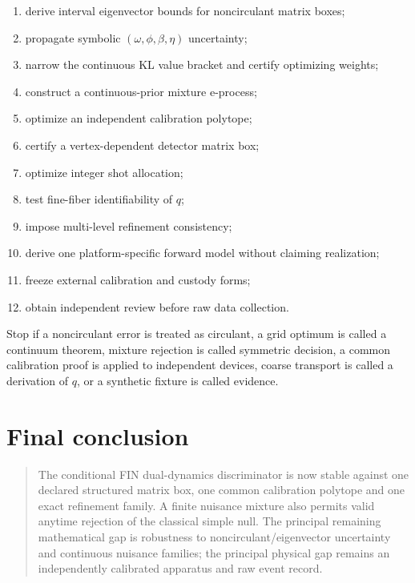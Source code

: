 \documentclass[11pt,a4paper]{article}
\begin{document}
\begin{enumerate}
\item derive interval eigenvector bounds for noncirculant matrix boxes;
\item propagate symbolic $(\omega,\phi,\beta,\eta)$ uncertainty;
\item narrow the continuous KL value bracket and certify optimizing weights;
\item construct a continuous-prior mixture e-process;
\item optimize an independent calibration polytope;
\item certify a vertex-dependent detector matrix box;
\item optimize integer shot allocation;
\item test fine-fiber identifiability of $q$;
\item impose multi-level refinement consistency;
\item derive one platform-specific forward model without claiming realization;
\item freeze external calibration and custody forms;
\item obtain independent review before raw data collection.
\end{enumerate}

Stop if a noncirculant error is treated as circulant, a grid optimum is called
a continuum theorem, mixture rejection is called symmetric decision, a common
calibration proof is applied to independent devices, coarse transport is called
a derivation of $q$, or a synthetic fixture is called evidence.

\section{Final conclusion}

\begin{quote}
The conditional FIN dual-dynamics discriminator is now stable against one
declared structured matrix box, one common calibration polytope and one exact
refinement family.  A finite nuisance mixture also permits valid anytime
rejection of the classical simple null.  The principal remaining mathematical
gap is robustness to noncirculant/eigenvector uncertainty and continuous
nuisance families; the principal physical gap remains an independently
calibrated apparatus and raw event record.
\end{quote}

\appendix
\end{document}
